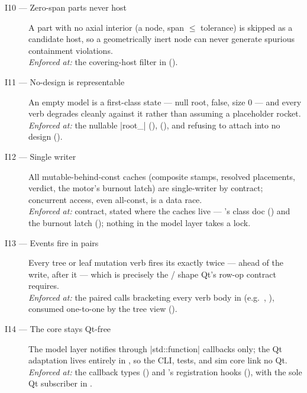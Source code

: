 \begin{description}
\item[I10 --- Zero-span parts never host] A part with no axial interior (a 
  node, span $\le$ tolerance) is skipped as a candidate host, so a geometrically inert
  node can never generate spurious containment violations.\\
  \emph{Enforced at:} the covering-host filter in 
  ().

\item[I11 --- No-design is representable] An empty model is a first-class state --- null
  root,  false, size 0 --- and every verb degrades cleanly against it
  rather than assuming a placeholder rocket.\\
  \emph{Enforced at:} the nullable \cppinline|root_|
  (), 
  (), and  refusing to attach into
  no design ().

\item[I12 --- Single writer] All mutable-behind-const caches (composite stamps, resolved
  placements, verdict, the motor's burnout latch) are single-writer by contract;
  concurrent access, even all-const, is a data race.\\
  \emph{Enforced at:} contract, stated where the caches live ---
  's class doc () and the burnout latch
  (); nothing in the model layer takes a lock.

\item[I13 --- Events fire in pairs] Every tree or leaf mutation verb fires its
   exactly twice ---  ahead of the write,
   after it --- which is precisely the /
  shape Qt's row-op contract requires.\\
  \emph{Enforced at:} the paired  calls bracketing every verb body in
   (e.g.\ ,
  ), consumed one-to-one by the tree view
  ().

\item[I14 --- The core stays Qt-free] The model layer notifies through
  \cppinline|std::function| callbacks only; the Qt adaptation lives entirely in
  , so the CLI, tests, and sim core link no Qt.\\
  \emph{Enforced at:} the callback types 
  () and 's registration hooks
  (), with the sole Qt subscriber in
  .

\end{description}

